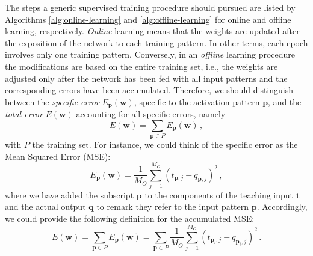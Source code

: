 \documentclass[12pt, a4paper, twoside, openright]{report}
\numberwithin{equation}{chapter}
\theoremstyle{theorem}
\theoremstyle{definition}
\theoremstyle{remark}
\theoremstyle{proposition}
\numberwithin{figure}{chapter}
\begin{document}
		The steps a generic supervised training procedure should pursued are listed by Algorithms \ref{alg:online-learning} and \ref{alg:offline-learning} for online and offline learning, respectively. \emph{Online} learning means that the weights are updated after the exposition of the network to each training pattern. In other terms, each epoch involves only one training pattern. Conversely, in an \emph{offline} learning procedure the modifications are based on the entire training set, i.e., the weights are adjusted only after the network has been fed with all input patterns and the corresponding errors have been accumulated. Therefore, we should distinguish between the \emph{specific error} $E_{\mathbf{p}}(\mathbf{w})$, specific to the activation pattern $\mathbf{p}$, and the \emph{total error} $E(\mathbf{w})$ accounting for all specific errors, namely
		\begin{equation}
			\label{eq:accumulated-error}
			E(\mathbf{w}) = \sum_{\mathbf{p} \in P} E_{\mathbf{p}}(\mathbf{w}) \, ,
		\end{equation}
		with $P$ the training set. For instance, we could think of the specific error as the Mean Squared Error (MSE): 
		\begin{equation}
			\label{eq:mse}
			E_{\mathbf{p}}(\mathbf{w}) = \dfrac{1}{M_O} \sum_{j = 1}^{M_O} \left( t_{\mathbf{p},j} - q_{\mathbf{p},j} \right)^2 \, ,
		\end{equation}
		where we have added the subscript $\mathbf{p}$ to the components of the teaching input $\mathbf{t}$ and the actual output $\mathbf{q}$ to remark they refer to the input pattern $\mathbf{p}$. Accordingly, we could provide the following definition for the accumulated MSE:
		\begin{equation}
			\label{eq:accumulated-mse}
			E(\mathbf{w}) = \sum_{\mathbf{p} \in P} E_{\mathbf{p}}(\mathbf{w}) = \sum_{\mathbf{p} \in P} \dfrac{1}{M_O} \sum_{j = 1}^{M_O} \left( t_{\mathbf{p}_i,j} - q_{\mathbf{p}_i,j} \right)^2 \, .
		\end{equation}
				
		\vspace*{0.3cm}
		
\end{document}
